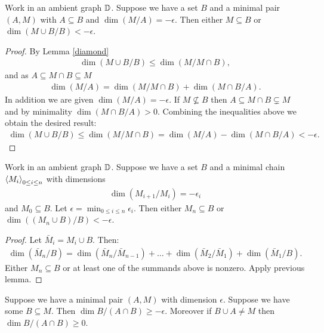 \documentclass{amsart}
\begin{document}
\begin{Lemma} \label{minimal_over_set}
  Work in an ambient graph $\mathbb D$.
  Suppose we have a set $B$ and a minimal pair $(A, M)$ with $A \subseteq B$ and $\dim(M/A) = -\epsilon$.
  Then either $M \subseteq B$ or $\dim(M \cup B/B) < -\epsilon$.
\end{Lemma}

\begin{proof}
  By Lemma \ref{diamond}
  \begin{align*}
    \dim(M \cup B/B) \leq \dim(M / M \cap B),
  \end{align*}
  and as $A \subseteq M \cap B \subseteq M$
  \begin{align*}
    \dim (M/A) = \dim(M / M \cap B) + \dim(M \cap B / A).
  \end{align*}
  In addition we are given $\dim (M/A) = -\epsilon$.
  If $M \not\subseteq B$ then $A \subseteq M \cap B \subsetneq M$ and by minimality $\dim(M \cap B / A) > 0$.
  Combining the inequalities above we obtain the desired result:
  \begin{align*}
    \dim(M \cup B/B) \leq \dim(M / M \cap B) = \dim (M/A) - \dim(M \cap B / A) < -\epsilon.
  \end{align*}
\end{proof}

\begin{Lemma}	\label{chain_lemma}
  Work in an ambient graph $\mathbb D$.
  Suppose we have a set $B$ and a minimal chain  $\left\langle M_i \right\rangle_{0 \leq i \leq n}$ with dimensions
  \begin{align*}
    \dim(M_{i+1}/M_i) = -\epsilon_i
  \end{align*}
  and $M_0 \subseteq B$.
  Let $\epsilon = \min_{0 \leq i \leq n} \epsilon_i$.
  Then either $M_n \subseteq B$ or $\dim((M_n \cup B)/B) < -\epsilon$.
\end{Lemma}

\begin{proof}
  Let $\bar M_i = M_i \cup B$. Then:
  \begin{align*}
    \dim(\bar M_n/B) = \dim(\bar M_n/\bar M_{n-1}) + \ldots + \dim(\bar M_2/\bar M_1) + \dim(\bar M_1/B).
  \end{align*}
  Either $M_n \subseteq B$ or at least one of the summands above is nonzero.
  Apply previous lemma.
\end{proof}

\begin{Lemma} \label{minimal_subset}
  Suppose we have a minimal pair $(A, M)$ with dimension $\epsilon$.
  Suppose we have some $B \subseteq M$.
  Then $\dim B / (A \cap B) \geq -\epsilon$.
  Moreover if $B \cup A \neq M$ then $\dim B / (A \cap B) \geq 0$.
\end{Lemma}
\end{document}
